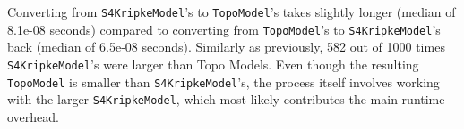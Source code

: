 \documentclass[12pt,a4paper]{article}
\begin{document}
Converting from \verb|S4KripkeModel|'s to \verb|TopoModel|'s takes slightly longer (median of 8.1e-08 seconds)
compared to converting from \verb|TopoModel|'s to \verb|S4KripkeModel|'s back (median of 6.5e-08 seconds).
Similarly as previously, 582 out of 1000 times \verb|S4KripkeModel|'s were larger than Topo Models.
Even though the resulting \verb|TopoModel| is smaller than \verb|S4KripkeModel|'s, the process itself involves
working with the larger \verb|S4KripkeModel|, which most likely contributes the main runtime overhead.





\end{document}
